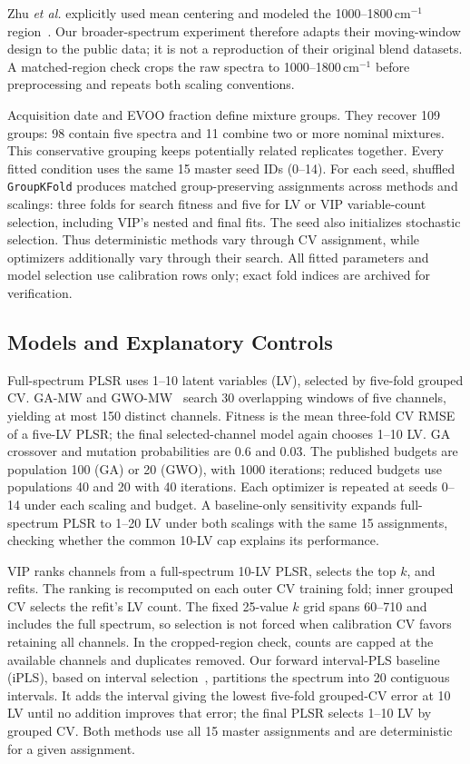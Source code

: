 Zhu \textit{et al.} explicitly used mean centering and modeled the 1000--1800\,cm$^{-1}$ region~\cite{zhu2023}. Our broader-spectrum experiment therefore adapts their moving-window design to the public data; it is not a reproduction of their original blend datasets. A matched-region check crops the raw spectra to 1000--1800\,cm$^{-1}$ before preprocessing and repeats both scaling conventions.

Acquisition date and EVOO fraction define mixture groups. They recover 109 groups: 98 contain five spectra and 11 combine two or more nominal mixtures. This conservative grouping keeps potentially related replicates together. Every fitted condition uses the same 15 master seed IDs (0--14). For each seed, shuffled \texttt{GroupKFold} produces matched group-preserving assignments across methods and scalings: three folds for search fitness and five for LV or VIP variable-count selection, including VIP's nested and final fits. The seed also initializes stochastic selection. Thus deterministic methods vary through CV assignment, while optimizers additionally vary through their search. All fitted parameters and model selection use calibration rows only; exact fold indices are archived for verification.

\subsection{Models and Explanatory Controls}
Full-spectrum PLSR uses 1--10 latent variables (LV), selected by five-fold grouped CV. GA-MW and GWO-MW~\cite{mirjalili2014} search 30 overlapping windows of five channels, yielding at most 150 distinct channels. Fitness is the mean three-fold CV RMSE of a five-LV PLSR; the final selected-channel model again chooses 1--10 LV. GA crossover and mutation probabilities are 0.6 and 0.03. The published budgets are population 100 (GA) or 20 (GWO), with 1000 iterations; reduced budgets use populations 40 and 20 with 40 iterations. Each optimizer is repeated at seeds 0--14 under each scaling and budget. A baseline-only sensitivity expands full-spectrum PLSR to 1--20 LV under both scalings with the same 15 assignments, checking whether the common 10-LV cap explains its performance.

VIP ranks channels from a full-spectrum 10-LV PLSR, selects the top $k$, and refits. The ranking is recomputed on each outer CV training fold; inner grouped CV selects the refit's LV count. The fixed 25-value $k$ grid spans 60--710 and includes the full spectrum, so selection is not forced when calibration CV favors retaining all channels. In the cropped-region check, counts are capped at the available channels and duplicates removed. Our forward interval-PLS baseline (iPLS), based on interval selection~\cite{norgaard2000}, partitions the spectrum into 20 contiguous intervals. It adds the interval giving the lowest five-fold grouped-CV error at 10 LV until no addition improves that error; the final PLSR selects 1--10 LV by grouped CV. Both methods use all 15 master assignments and are deterministic for a given assignment.

